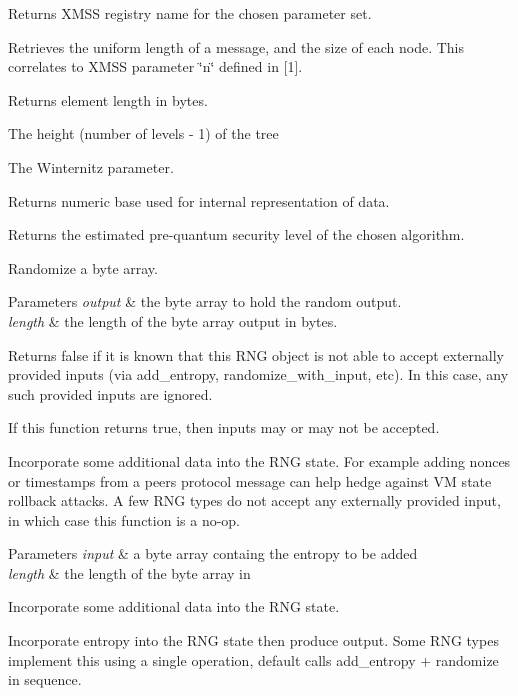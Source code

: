 \begin{DoxyReturn}{Returns}
X\+M\+SS registry name for the chosen parameter set.
\end{DoxyReturn}
Retrieves the uniform length of a message, and the size of each node. This correlates to X\+M\+SS parameter \char`\"{}n\char`\"{} defined in \mbox{[}1\mbox{]}.

\begin{DoxyReturn}{Returns}
element length in bytes.

The height (number of levels -\/ 1) of the tree
\end{DoxyReturn}
The Winternitz parameter.

\begin{DoxyReturn}{Returns}
numeric base used for internal representation of data.
\end{DoxyReturn}
Returns the estimated pre-\/quantum security level of the chosen algorithm.

Randomize a byte array. 
\begin{DoxyParams}{Parameters}
{\em output} & the byte array to hold the random output. \\
\hline
{\em length} & the length of the byte array output in bytes.\\
\hline
\end{DoxyParams}
Returns false if it is known that this R\+NG object is not able to accept externally provided inputs (via add\+\_\+entropy, randomize\+\_\+with\+\_\+input, etc). In this case, any such provided inputs are ignored.

If this function returns true, then inputs may or may not be accepted.

Incorporate some additional data into the R\+NG state. For example adding nonces or timestamps from a peer\textquotesingle{}s protocol message can help hedge against VM state rollback attacks. A few R\+NG types do not accept any externally provided input, in which case this function is a no-\/op.


\begin{DoxyParams}{Parameters}
{\em input} & a byte array containg the entropy to be added \\
\hline
{\em length} & the length of the byte array in\\
\hline
\end{DoxyParams}
Incorporate some additional data into the R\+NG state.

Incorporate entropy into the R\+NG state then produce output. Some R\+NG types implement this using a single operation, default calls add\+\_\+entropy + randomize in sequence.

